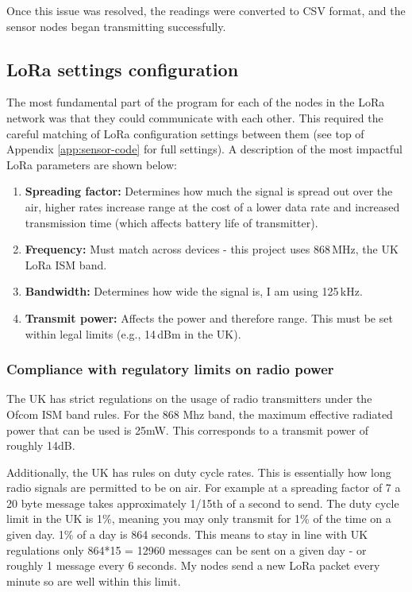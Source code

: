 Once this issue was resolved, the readings were converted to CSV format, and the
sensor nodes began transmitting successfully.

\subsection{LoRa settings configuration}

The most fundamental part of the program for each of the nodes in the LoRa
network was that they could communicate with each other. This required the
careful matching of LoRa configuration settings between them (see top of
Appendix \ref{app:sensor-code} for full settings). A description of the most
impactful LoRa parameters are shown below:

\begin{enumerate}
      \item \textbf{Spreading factor:} Determines how much the signal is spread
            out over the air, higher rates increase range at the cost of a lower
            data rate and increased transmission time (which affects battery
            life of transmitter).
      \item \textbf{Frequency:} Must match across devices - this project uses
            868\,MHz, the UK LoRa ISM band.
      \item \textbf{Bandwidth:} Determines how wide the signal is, I am using
            125\,kHz.
      \item \textbf{Transmit power:} Affects the power and therefore range. This
            must be set within legal limits (e.g., 14\,dBm in the UK).
\end{enumerate}

\subsubsection{Compliance with regulatory limits on radio
      power}\label{sec:lora-limit}

The UK has strict regulations on the usage of radio transmitters under the Ofcom
ISM band rules. For the 868 Mhz band, the maximum effective radiated power that
can be used is 25mW. This corresponds to a transmit power of roughly 14dB.

Additionally, the UK has rules on duty cycle rates. This is essentially how long
radio signals are permitted to be on air. For example at a spreading factor of 7
a 20 byte message takes approximately 1/15th of a second to send. The duty cycle
limit in the UK is 1\%, meaning you may only transmit for 1\% of the time on a
given day. 1\% of a day is 864 seconds. This means to stay in line with UK
regulations only 864*15 = 12960 messages can be sent on a given day - or roughly
1 message every 6 seconds. My nodes send a new LoRa packet every minute so are
well within this limit.

